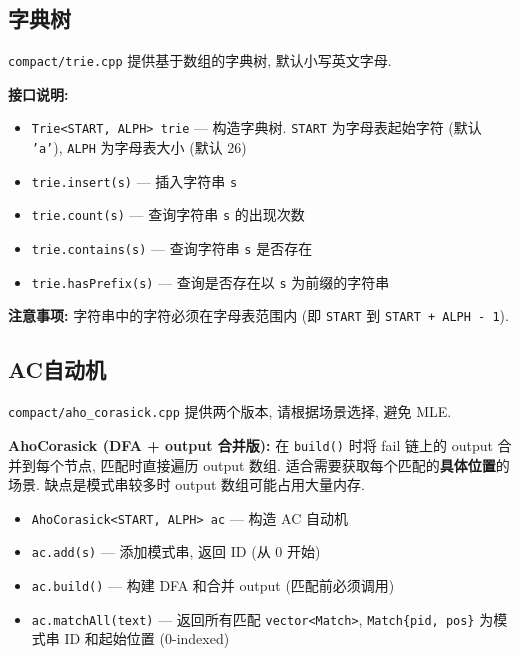 \documentclass[a4paper]{ctexbook}
\begin{document}
\subsection{字典树}

\texttt{compact/trie.cpp} 提供基于数组的字典树, 默认小写英文字母.

\textbf{接口说明:}
\begin{itemize}
	\item \texttt{Trie<START, ALPH> trie} — 构造字典树. \texttt{START} 为字母表起始字符 (默认 \texttt{'a'}), \texttt{ALPH} 为字母表大小 (默认 26)
	\item \texttt{trie.insert(s)} — 插入字符串 \texttt{s}
	\item \texttt{trie.count(s)} — 查询字符串 \texttt{s} 的出现次数
	\item \texttt{trie.contains(s)} — 查询字符串 \texttt{s} 是否存在
	\item \texttt{trie.hasPrefix(s)} — 查询是否存在以 \texttt{s} 为前缀的字符串
\end{itemize}

\textbf{注意事项:} 字符串中的字符必须在字母表范围内 (即 \texttt{START} 到 \texttt{START + ALPH - 1}).



\subsection{AC自动机}

\texttt{compact/aho\_corasick.cpp} 提供两个版本, 请根据场景选择, 避免 MLE.

\textbf{AhoCorasick (DFA + output 合并版):} 在 \texttt{build()} 时将 fail 链上的 output 合并到每个节点, 匹配时直接遍历 output 数组. 适合需要获取每个匹配的\textbf{具体位置}的场景. 缺点是模式串较多时 output 数组可能占用大量内存.

\begin{itemize}
	\item \texttt{AhoCorasick<START, ALPH> ac} — 构造 AC 自动机
	\item \texttt{ac.add(s)} — 添加模式串, 返回 ID (从 0 开始)
	\item \texttt{ac.build()} — 构建 DFA 和合并 output (匹配前必须调用)
	\item \texttt{ac.matchAll(text)} — 返回所有匹配 \texttt{vector<Match>}, \texttt{Match\{pid, pos\}} 为模式串 ID 和起始位置 (0-indexed)
\end{itemize}
\end{document}
